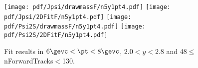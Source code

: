 \begin{figure}[H]
\begin{center}
\texttt{[image: pdf/Jpsi/drawmassF/n5y1pt4.pdf]}
\texttt{[image: pdf/Jpsi/2DFitF/n5y1pt4.pdf]}
\vspace*{-0.5cm}
\texttt{[image: pdf/Psi2S/drawmassF/n5y1pt4.pdf]}
\texttt{[image: pdf/Psi2S/2DFitF/n5y1pt4.pdf]}
\vspace*{-0.5cm}
\end{center}
\caption{Fit results in $6\gevc<\pt<8\gevc$, $2.0<y<2.8$ and 48$\leq$nForwardTracks$<$130.}
\label{Fitn5y1pt4}
\end{figure}
